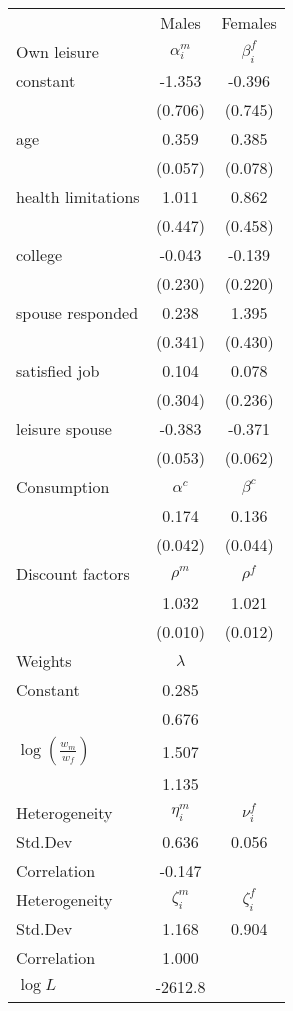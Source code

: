 \begin{tabular}{lcc} 
\hline\hline 
 & Males & Females \\ 
Own leisure & $\alpha_{i}^{m}$ & $\beta_{i}^{f}$ \\ 
constant & -1.353 & -0.396 \\ 
 & (0.706) & (0.745) \\ 
age & 0.359 & 0.385 \\ 
 & (0.057) & (0.078) \\ 
health limitations & 1.011 & 0.862 \\ 
 & (0.447) & (0.458) \\ 
college & -0.043 & -0.139 \\ 
 & (0.230) & (0.220) \\ 
spouse responded & 0.238 & 1.395 \\ 
 & (0.341) & (0.430) \\ 
satisfied job & 0.104 & 0.078 \\ 
 & (0.304) & (0.236) \\ 
leisure spouse & -0.383 & -0.371 \\ 
 & (0.053) & (0.062) \\ 
Consumption & $\alpha^{c}$ & $\beta^{c}$ \\ 
 & 0.174 & 0.136 \\ 
 & (0.042) & (0.044) \\ 
Discount factors & $\rho^m$ & $\rho^f$ \\ 
 & 1.032 & 1.021 \\ 
 & (0.010) & (0.012) \\ 
Weights & $\lambda$ &  \\ 
Constant & 0.285 &  \\ 
 & 0.676 &  \\ 
$\log(\frac{w_m}{w_f})$ & 1.507 &  \\ 
 & 1.135 &  \\ 
Heterogeneity & $\eta_i^m$ & $\nu_i^f$ \\ 
Std.Dev & 0.636 & 0.056 \\ 
Correlation & -0.147 &  \\ 
Heterogeneity & $\zeta_i^m$ & $\zeta_i^f$ \\ 
Std.Dev & 1.168 & 0.904 \\ 
Correlation & 1.000 &  \\ 
\hline 
$\log L$ & -2612.8 & \\ 
\hline \hline 
\end{tabular} 

